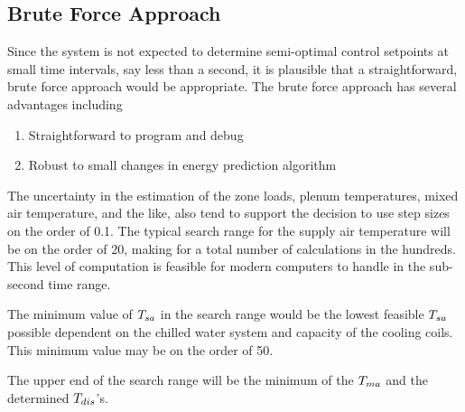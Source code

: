 
\subsection{Brute Force Approach}

Since the system is not expected to determine semi-optimal
control setpoints at small time intervals, say less than a second, it is
plausible that a straightforward, brute force approach would be
appropriate.  The brute force approach has several advantages including
\begin{enumerate}
        \item Straightforward to program and debug
        \item Robust to small changes in energy prediction algorithm 
\end{enumerate}

The uncertainty in the estimation of the zone loads, plenum
temperatures, mixed air temperature, and the like, also tend to support
the decision to use step sizes on the order of  \SI{0.1}{\degreeF}. The
typical search range for the supply air temperature will be on the order
of \SI{20}{\degreeF}, making for a total number of calculations in the
hundreds.  This level of computation is feasible for modern
computers to handle in the sub-second time range. 

The minimum value of \(T_{sa}\) in the search range would be the lowest
feasible \(T_{sa}\) possible dependent on the chilled water system and
capacity of the cooling coils.  This minimum value may be on the order of
\SI{50}{\degreeF}.

The upper end of the search range will be the minimum of the \(T_{ma}\)
and the determined \(T_{dis}\)'s.

